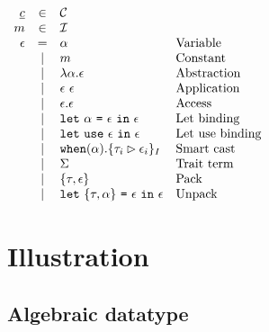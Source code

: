\documentclass{article}[11pt]
\newcommand{\term}[1]{\verb~#1~}
\begin{document}
    \begin{math}
        \begin{array}{rclp{5cm}}
            \underline{c} & \in & {\cal C} \\
            m & \in & {\cal I} \\
            \epsilon & =
                   & \alpha                                                                  & Variable        \\
            & \mid & m                                                                       & Constant        \\
            & \mid & \lambda \alpha . \epsilon                                               & Abstraction     \\
            & \mid & \epsilon~\epsilon                                                       & Application     \\
            & \mid & \epsilon . \epsilon                                                     & Access          \\
            & \mid & \term{let}~\alpha ~ \term{=} ~ \epsilon ~\term{in}~\epsilon             & Let~binding     \\
            & \mid & \term{let}~\term{use} ~ \epsilon ~\term{in}~\epsilon                    & Let~use~binding \\
            & \mid & \term{when}(\alpha).\{ \tau_i \rhd \epsilon_i \}_I                      & Smart cast      \\
            & \mid & \Sigma                                                                  & Trait~term      \\
            & \mid & \{\tau, \epsilon\}                                                      & Pack            \\
            & \mid & \term{let} ~ \{\tau, \alpha\} ~ \term{=} ~ \epsilon ~\term{in}~\epsilon & Unpack          \\
        \end{array}
    \end{math}


    \section{Illustration}\label{sec:illustration}

    \subsection{Algebraic datatype}\label{subsec:algebraic-datatype}
\end{document}
